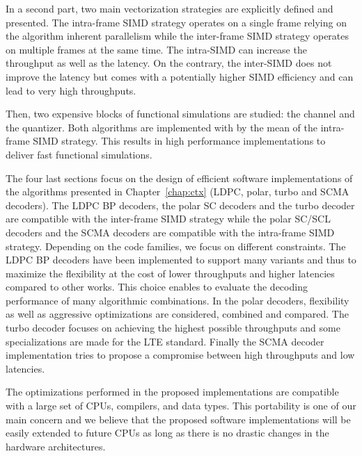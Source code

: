 In a second part, two main vectorization strategies are explicitly defined and
presented. The intra-frame SIMD strategy operates on a single frame relying
on the algorithm inherent parallelism while the inter-frame SIMD strategy
operates on multiple frames at the same time. The intra-SIMD can increase the
throughput as well as the latency. On the contrary, the inter-SIMD does not
improve the latency but comes with a potentially higher SIMD efficiency and can
lead to very high throughputs.

Then, two expensive blocks of functional simulations are studied: the channel
and the quantizer. Both algorithms are implemented with \MIPP by the mean of the
intra-frame SIMD strategy. This results in high performance implementations to
deliver fast functional simulations.

The four last sections focus on the design of efficient software implementations
of the algorithms presented in Chapter~\ref{chap:ctx} (LDPC, polar, turbo and
SCMA decoders). The LDPC BP decoders, the polar SC decoders and the turbo
decoder are compatible with the inter-frame SIMD strategy while the polar SC/SCL
decoders and the SCMA decoders are compatible with the intra-frame SIMD
strategy. Depending on the code families, we focus on different constraints. The
LDPC BP decoders have been implemented to support many variants and thus to
maximize the flexibility at the cost of lower throughputs and higher latencies
compared to other works. This choice enables to evaluate the decoding
performance of many algorithmic combinations. In the polar decoders, flexibility
as well as aggressive optimizations are considered, combined and compared. The
turbo decoder focuses on achieving the highest possible throughputs and some
specializations are made for the LTE standard. Finally the SCMA decoder
implementation tries to propose a compromise between high throughputs and low
latencies.

The optimizations performed in the proposed implementations are compatible with
a large set of CPUs, compilers, and data types. This portability is one of our
main concern and we believe that the proposed software implementations will be
easily extended to future CPUs as long as there is no drastic changes in the
hardware architectures.

